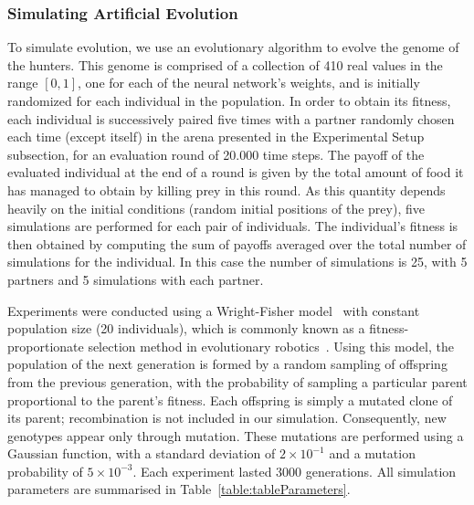     \subsubsection{Simulating Artificial Evolution} 
    \label{artificialEvolution}
      To simulate evolution, we use an evolutionary algorithm to evolve the genome of the hunters. This genome is comprised of a collection of 410 real values in the range \([0,1]\), one for each of the neural network's weights, and is initially randomized for each individual in the population. In order to obtain its fitness, each individual is successively paired five times with a partner randomly chosen each time (except itself) in the arena presented in the Experimental Setup subsection, for an evaluation round of 20.000 time steps. The payoff of the evaluated individual at the end of a round is given by the total amount of food it has managed to obtain by killing prey in this round. As this quantity depends heavily on the initial conditions (random initial positions of the prey), five simulations are performed for each pair of individuals. The individual's fitness is then obtained by computing the sum of payoffs averaged over the total number of simulations for the individual. In this case the number of simulations is 25, with 5 partners and 5 simulations with each partner.

      Experiments were conducted using a Wright-Fisher model~\cite{Wright1931} with constant population size (20 individuals), which is commonly known as a fitness-proportionate selection method in evolutionary robotics~\cite{Eiben2003}. Using this model, the population of the next generation is formed by a random sampling of offspring from the previous generation, with the probability of sampling a particular parent proportional to the parent's fitness. Each offspring is simply a mutated clone of its parent; recombination is not included in our simulation. Consequently, new genotypes appear only through mutation. These mutations are performed using a Gaussian function, with a standard deviation of \(2 \times 10^{-1}\) and a mutation probability of \(5 \times 10^{-3}\). Each experiment lasted 3000 generations. All simulation parameters are summarised in Table~\ref{table:tableParameters}.

